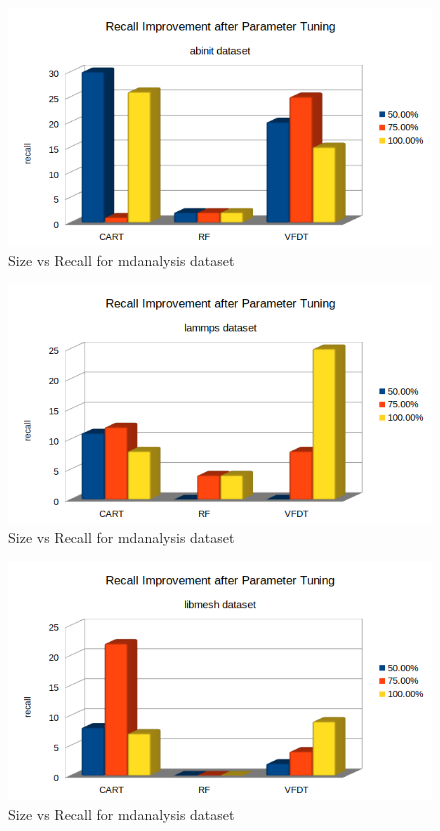 \documentclass[sigplan]{acmart}\settopmatter{printfolios=true,printccs=false,printacmref=false}
\begin{document}
\begin{figure}[h]
	\includegraphics[width=\linewidth]{fig/tune-ab.png}
	\caption{Size vs Recall for mdanalysis dataset}
	\label{fig:tune-ab}
\end{figure}

\begin{figure}[h]
	\includegraphics[width=\linewidth]{fig/tune-lm.png}
	\caption{Size vs Recall for mdanalysis dataset}
	\label{fig:tune-lm}
\end{figure}

\begin{figure}[h]
	\includegraphics[width=\linewidth]{fig/tune-lb.png}
	\caption{Size vs Recall for mdanalysis dataset}
	\label{fig:tune-lb}
\end{figure}
\end{document}
